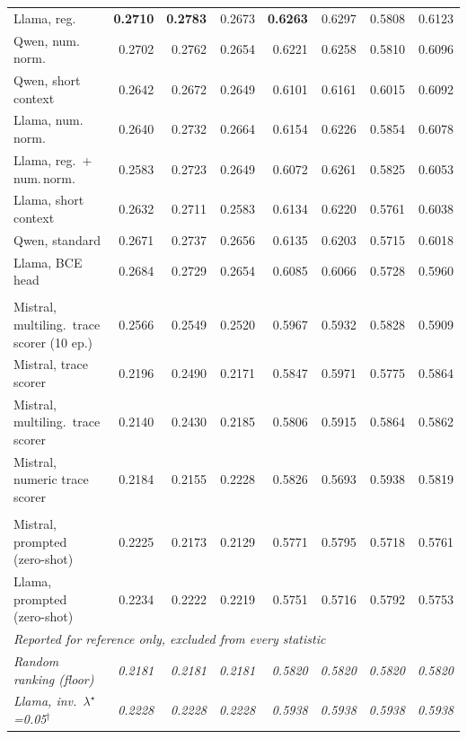 \begin{table}[H]
\begin{tabular}{l rrr rrr r}
\quad Llama, reg. & \textbf{0.2710} & \textbf{0.2783} & 0.2673 & \textbf{0.6263} & 0.6297 & 0.5808 & 0.6123 \\
\quad Qwen, num.\,norm. & 0.2702 & 0.2762 & 0.2654 & 0.6221 & 0.6258 & 0.5810 & 0.6096 \\
\quad Qwen, short context & 0.2642 & 0.2672 & 0.2649 & 0.6101 & 0.6161 & 0.6015 & 0.6092 \\
\quad Llama, num.\,norm. & 0.2640 & 0.2732 & 0.2664 & 0.6154 & 0.6226 & 0.5854 & 0.6078 \\
\quad Llama, reg.\ + num.\,norm. & 0.2583 & 0.2723 & 0.2649 & 0.6072 & 0.6261 & 0.5825 & 0.6053 \\
\quad Llama, short context & 0.2632 & 0.2711 & 0.2583 & 0.6134 & 0.6220 & 0.5761 & 0.6038 \\
\quad Qwen, standard & 0.2671 & 0.2737 & 0.2656 & 0.6135 & 0.6203 & 0.5715 & 0.6018 \\
\quad Llama, BCE head & 0.2684 & 0.2729 & 0.2654 & 0.6085 & 0.6066 & 0.5728 & 0.5960 \\
\addlinespace[3pt]
\multicolumn{8}{l}{\itshape Earlier trace scorers}\\
\quad Mistral, multiling.\ trace scorer (10 ep.) & 0.2566 & 0.2549 & 0.2520 & 0.5967 & 0.5932 & 0.5828 & 0.5909 \\
\quad Mistral, trace scorer & 0.2196 & 0.2490 & 0.2171 & 0.5847 & 0.5971 & 0.5775 & 0.5864 \\
\quad Mistral, multiling.\ trace scorer & 0.2140 & 0.2430 & 0.2185 & 0.5806 & 0.5915 & 0.5864 & 0.5862 \\
\quad Mistral, numeric trace scorer & 0.2184 & 0.2155 & 0.2228 & 0.5826 & 0.5693 & 0.5938 & 0.5819 \\
\addlinespace[3pt]
\multicolumn{8}{l}{\itshape Prompted baselines}\\
\quad Mistral, prompted (zero-shot) & 0.2225 & 0.2173 & 0.2129 & 0.5771 & 0.5795 & 0.5718 & 0.5761 \\
\quad Llama, prompted (zero-shot) & 0.2234 & 0.2222 & 0.2219 & 0.5751 & 0.5716 & 0.5792 & 0.5753 \\
\midrule
\multicolumn{8}{l}{\itshape Reported for reference only, excluded from every statistic}\\
\quad \itshape Random ranking (floor) & \itshape 0.2181 & \itshape 0.2181 & \itshape 0.2181 & \itshape 0.5820 & \itshape 0.5820 & \itshape 0.5820 & \itshape 0.5820 \\
\quad \itshape Llama, inv.\ $\lambda^\star$=0.05$^{\dagger}$ & \itshape 0.2228 & \itshape 0.2228 & \itshape 0.2228 & \itshape 0.5938 & \itshape 0.5938 & \itshape 0.5938 & \itshape 0.5938 \\

\end{tabular}
\end{table}

